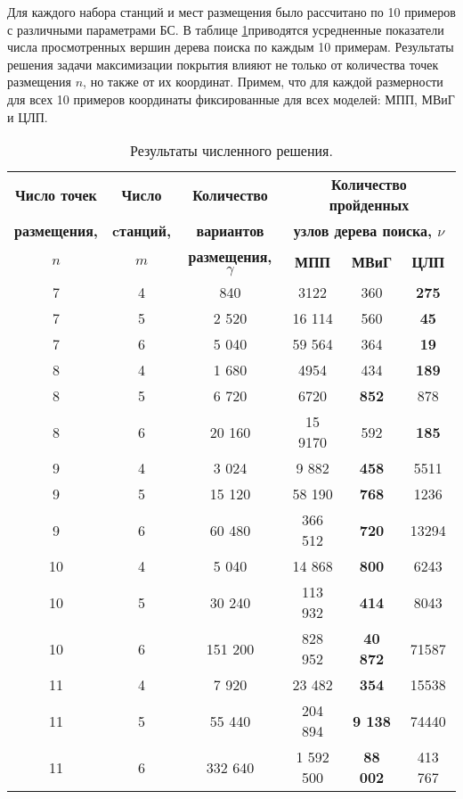Для каждого набора станций и мест размещения было рассчитано по 10 примеров с различными параметрами БС. В таблице \cref{tab:models_comparation}приводятся усредненные показатели числа просмотренных вершин дерева поиска по каждым 10 примерам. Результаты решения задачи максимизации покрытия влияют не только от количества точек размещения $n$, но также от их координат. Примем, что для каждой размерности для всех 10 примеров координаты фиксированные для всех моделей: МПП, МВиГ и ЦЛП. 


\begin{table}
  \caption{Результаты численного решения.}\label{tab:models_comparation}
  \begin{tabular}{|ccc|*{3}{c}|} \cline{3-6}
  \hline
  \textbf{Число точек} & \textbf{Число} &\textbf{Количество} & \multicolumn{3}{c|}{\textbf{Количество пройденных}}\\ 
  \textbf{размещения,} & \textbf{cтанций,} & \textbf{вариантов} & \multicolumn{3}{c|}{\textbf{узлов дерева поиска, $\nu$}}\\
  \cline{4-6}
  \textbf{$n$} & \textbf{$m$} &\textbf{размещения, $\gamma$} & \textbf{МПП}& \textbf{МВиГ} & \textbf{ЦЛП} \\ 
  \hline
  7 &  4 & 840 & 3122 & 360 &  \textbf{275} \\
  7 &  5 & 2 520 & 16 114 & 560  &  \textbf{45}  \\
  7 &  6 & 5 040 & 59 564 & 364  &  \textbf{19}  \\
  8 &  4 & 1 680 &  4954 &  434 &   \textbf{189} \\
  8 &  5 & 6 720 & 6720 & \textbf{852}  &  878 \\
  8 &  6 & 20 160 &  15 9170 & 592  & \textbf{185}  \\
  9  &  4 & 3 024 & 9 882 & \textbf{458} & 5511 \\
  9  &  5 & 15 120&  58 190 &  \textbf{768} &  1236\\
  9  &  6 & 60 480&  366 512 &  \textbf{720} & 13294 \\
  10 &  4 & 5 040&  14 868&  \textbf{800}&  6243\\
  10 &	5 & 30 240&  113 932&  \textbf{414}&  8043\\
  10 &	6 & 151 200&  828 952&  \textbf{40 872}&  71587\\
  11 &  4 & 7 920& 23 482&  \textbf{354} & 15538\\
  11 &	5 & 55 440& 204 894& \textbf{9 138}&  74440\\
  11 &	6 & 332 640& 1 592 500 & \textbf{88 002} & 413 767 \\
  \hline
  \end{tabular}
\end{table} 

